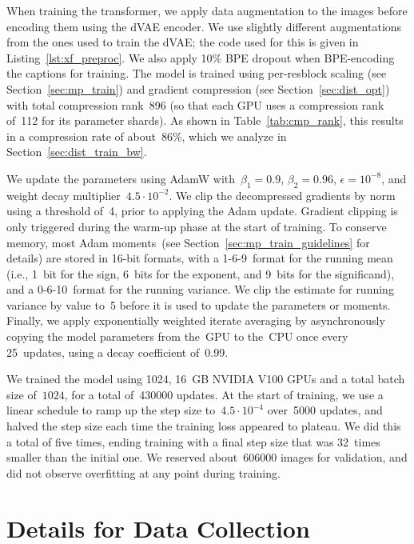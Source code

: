 \documentclass{article}
\begin{document}
When training the transformer, we apply data augmentation to the images before encoding them using the dVAE encoder. We use slightly different augmentations from the ones used to train the dVAE; the code used for this is given in Listing~\ref{lst:xf_preproc}. We also apply 10\% BPE dropout when BPE-encoding the captions for training. The model is trained using per-resblock scaling (see Section~\ref{sec:mp_train}) and gradient compression (see Section~\ref{sec:dist_opt}) with total compression rank~896 (so that each GPU uses a compression rank of~112 for its parameter shards). As shown in Table~\ref{tab:cmp_rank}, this results in a compression rate of about~86\%, which we analyze in Section~\ref{sec:dist_train_bw}.

We update the parameters using AdamW with~$\beta_1 = 0.9$, $\beta_2 = 0.96$, $\epsilon = 10^{-8}$, and weight decay multiplier~$4.5 \cdot 10^{-2}$. We clip the decompressed gradients by norm using a threshold of~4, prior to applying the Adam update. Gradient clipping is only triggered during the warm-up phase at the start of training. To conserve memory, most Adam moments~(see Section~\ref{sec:mp_train_guidelines} for details) are stored in 16-bit formats, with a 1-6-9~format for the running mean (i.e., 1~bit for the sign, 6~bits for the exponent, and 9~bits for the significand), and a 0-6-10~format for the running variance. We clip the estimate for running variance by value to~5 before it is used to update the parameters or moments. Finally, we apply exponentially weighted iterate averaging by asynchronously copying the model parameters from the~GPU to the~CPU once every 25~updates, using a decay coefficient of~0.99.

We trained the model using 1024, 16~GB NVIDIA V100 GPUs and a total batch size of~$1024$, for a total of~\num{430000} updates. At the start of training, we use a linear schedule to ramp up the step size to~$4.5 \cdot 10^{-4}$ over~\num{5000} updates, and halved the step size each time the training loss appeared to plateau. We did this a total of five times, ending training with a final step size that was 32~times smaller than the initial one. We reserved about~\num{606000} images for validation, and did not observe overfitting at any point during training.

\section{Details for Data Collection}
\label{sec:data_collection_details}
\end{document}
